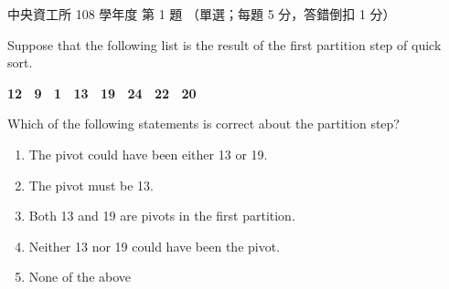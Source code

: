 \begin{pastexam}[label={px:ncu-108-dsa-01}]{中央資工所 108 學年度 第 1 題}
（單選；每題 5 分，答錯倒扣 1 分）

Suppose that the following list is the result of the first partition step of quick sort.
\begin{center}\textbf{12 \ 9 \ 1 \ 13 \ 19 \ 24 \ 22 \ 20}\end{center}
Which of the following statements is correct about the partition step?
\begin{enumerate}[label=(\Alph*)]
\item The pivot could have been either 13 or 19.
\item The pivot must be 13.
\item Both 13 and 19 are pivots in the first partition.
\item Neither 13 nor 19 could have been the pivot.
\item None of the above
\end{enumerate}
\end{pastexam}

